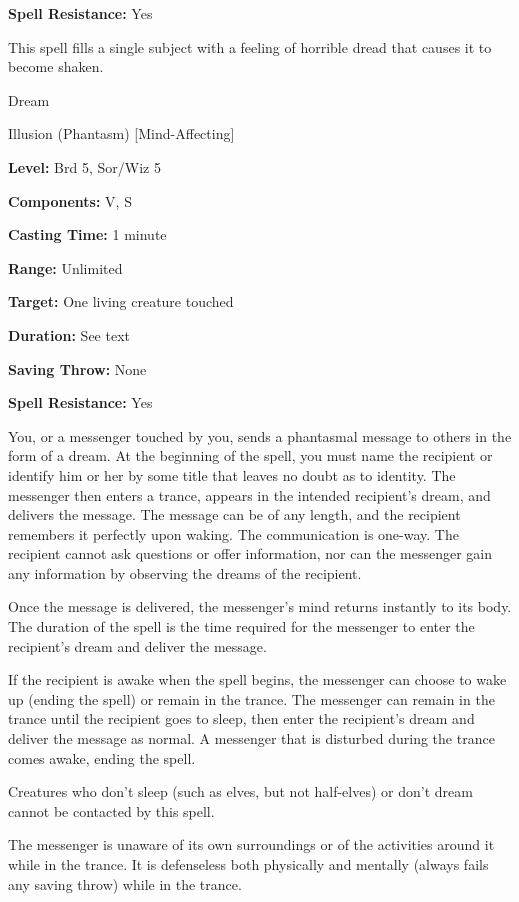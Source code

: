 \documentclass{article}
\begin{document}
\textbf{Spell Resistance:} Yes

This spell fills a single subject with a feeling of horrible dread that causes 
it to become shaken.

\vspace{12pt}
Dream

Illusion (Phantasm) [Mind-Affecting]

\textbf{Level:} Brd 5, Sor/Wiz 5

\textbf{Components:} V, S

\textbf{Casting Time:} 1 minute

\textbf{Range:} Unlimited

\textbf{Target:} One living creature touched

\textbf{Duration:} See text

\textbf{Saving Throw:} None

\textbf{Spell Resistance:} Yes

You, or a messenger touched by you, sends a phantasmal message to others in the 
form of a dream. At the beginning of the spell, you must name the recipient or 
identify him or her by some title that leaves no doubt as to identity. The messenger 
then enters a trance, appears in the intended recipient's dream, and delivers the 
message. The message can be of any length, and the recipient remembers it perfectly 
upon waking. The communication is one-way. The recipient cannot ask questions or 
offer information, nor can the messenger gain any information by observing the 
dreams of the recipient.

Once the message is delivered, the messenger's mind returns instantly to its body. 
The duration of the spell is the time required for the messenger to enter the recipient's 
dream and deliver the message.

If the recipient is awake when the spell begins, the messenger can choose to wake 
up (ending the spell) or remain in the trance. The messenger can remain in the 
trance until the recipient goes to sleep, then enter the recipient's dream and 
deliver the message as normal. A messenger that is disturbed during the trance 
comes awake, ending the spell.

Creatures who don't sleep (such as elves, but not half-elves) or don't dream cannot 
be contacted by this spell.

The messenger is unaware of its own surroundings or of the activities around it 
while in the trance. It is defenseless both physically and mentally (always fails 
any saving throw) while in the trance.
\end{document}
